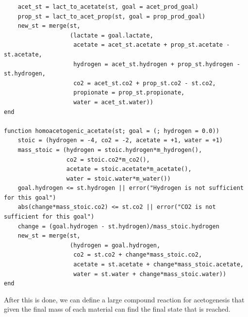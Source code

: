 \documentclass[11pt]{article}
\begin{document}
\begin{verbatim}
    acet_st = lact_to_acetate(st, goal = acet_prod_goal)
    prop_st = lact_to_acet_prop(st, goal = prop_prod_goal)
    new_st = merge(st,
                   (lactate = goal.lactate,
                    acetate = acet_st.acetate + prop_st.acetate - st.acetate,
                    hydrogen = acet_st.hydrogen + prop_st.hydrogen - st.hydrogen,
                    co2 = acet_st.co2 + prop_st.co2 - st.co2,
                    propionate = prop_st.propionate,
                    water = acet_st.water))
end

function homoacetogenic_acetate(st; goal = (; hydrogen = 0.0))
    stoic = (hydrogen = -4, co2 = -2, acetate = +1, water = +1)
    mass_stoic = (hydrogen = stoic.hydrogen*m_hydrogen(),
                  co2 = stoic.co2*m_co2(),
                  acetate = stoic.acetate*m_acetate(),
                  water = stoic.water*m_water())
    goal.hydrogen <= st.hydrogen || error("Hydrogen is not sufficient for this goal")
    abs(change*mass_stoic.co2) <= st.co2 || error("CO2 is not sufficient for this goal")
    change = (goal.hydrogen - st.hydrogen)/mass_stoic.hydrogen
    new_st = merge(st,
                   (hydrogen = goal.hydrogen,
                    co2 = st.co2 + change*mass_stoic.co2,
                    acetate = st.acetate + change*mass_stoic.acetate,
                    water = st.water + change*mass_stoic.water))
end

\end{verbatim}

After this is done, we can define a large compound reaction for acetogenesis that given the final mass of each material can find the final state that is reached. 
\end{document}

